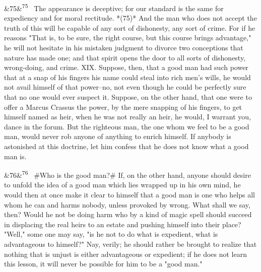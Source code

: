 \documentclass[12pt]{article}
\newcommand{\para}[1][]{\par\noindent\ifx&#1&\else\textsuperscript{\footnotesize #1}~\fi}
\begin{document}
\para[75] The appearance is deceptive; for our standard is the same for expediency and for moral rectitude. *(75)* And the man who does not accept the truth of this will be capable of any sort of dishonesty, any sort of crime. For if he reasons "That is, to be sure, the right course, but this course brings advantage," he will not hesitate in his mistaken judgment to divorce two conceptions that nature has made one; and that spirit opens the door to all sorts of dishonesty, wrong-doing, and crime. XIX. Suppose, then, that a good man had such power that at a snap of his fingers his name could steal into rich men's wills, he would not avail himself of that power--no, not even though he could be perfectly sure that no one would ever suspect it. Suppose, on the other hand, that one were to offer a Marcus Crassus the power, by the mere snapping of his fingers, to get himself named as heir, when he was not really an heir, he would, I warrant you, dance in the forum. But the righteous man, the one whom we feel to be a good man, would never rob anyone of anything to enrich himself. If anybody is astonished at this doctrine, let him confess that he does not know what a good man is.

\para[76] \#Who is the good man?\# If, on the other hand, anyone should desire to unfold the idea of a good man which lies wrapped up in his own mind, he would then at once make it clear to himself that a good man is one who helps all whom he can and harms nobody, unless provoked by wrong. What shall we say, then? Would he not be doing harm who by a kind of magic spell should succeed in displacing the real heirs to an estate and pushing himself into their place? "Well," some one may say, "is he not to do what is expedient, what is advantageous to himself?" Nay, verily; he should rather be brought to realize that nothing that is unjust is either advantageous or expedient; if he does not learn this lesson, it will never be possible for him to be a "good man."
\end{document}

